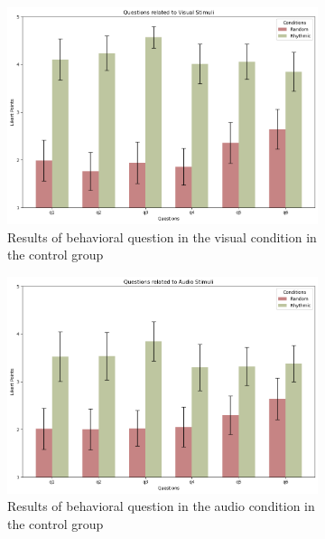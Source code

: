 \begin{figure}[htbp]
    \begin{subfigure}[htbp]{0.5\textwidth}
        \centering
        \includegraphics[width=\textwidth]{bar_plots/plotbar_visual_h.png}
        \caption{Results of behavioral question in the visual condition in the control group}
        \label{fig: bar_visual_control} 
    \end{subfigure} 
    \begin{subfigure}[htbp]{0.5\textwidth}
        \centering
        \includegraphics[width=\textwidth]{bar_plots/plotbar_audio_h.png}
        \caption{Results of behavioral question in the audio condition in the control group}
        \label{fig: bar_audio_control} 
    \end{subfigure} 
    \begin{subfigure}[htbp]{0.5\textwidth}

\end{subfigure}
\end{figure}
